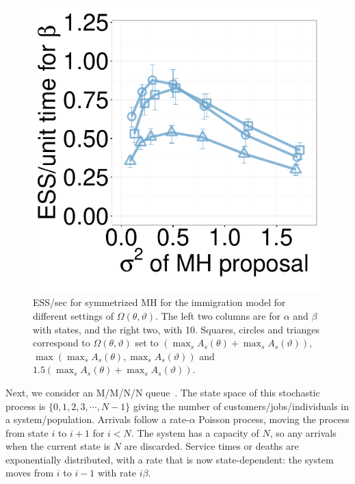 \begin{figure}[H]
\begin{minipage}[hp]{0.24\linewidth}
	\end{minipage}
  \begin{minipage}[hp]{0.24\linewidth}
  \centering
    \includegraphics [width=0.99\textwidth, angle=0]{figs/new_whole_exp_figs/mh_q_beta_dim10.pdf}
	\end{minipage}
    \caption{ESS/sec for symmetrized MH for the immigration model for different settings of $\Omega(\theta,\vartheta)$. The left two columns are for $\alpha$ and $\beta$ with states, and the right two, with 10. 
    Squares, circles and trianges correspond to $\Omega(\theta,\vartheta)$ set to $(\max_s A_s(\theta) + \max_s A_s(\vartheta))$, $\max(\max_s A_s(\theta), \max_s A_s(\vartheta))$ and  $1.5(\max_s A_s(\theta) + \max_s A_s(\vartheta))$.
  }
    \label{fig:mhESS_Q}
  \end{figure}


Next, we consider an M/M/N/N queue~\citep{gross2011fundamentals}. 
The state space of this stochastic process is $\{0, 1, 2, 3, \cdots, N - 1\}$ giving the number of customers/jobs/individuals in a system/population. 
Arrivals follow a rate-$\alpha$ Poisson process, moving the process from state 
$i$ to $i+1$ for $i<N$. The system has a capacity of $N$, so any arrivals when 
the current state is $N$ are discarded.  Service times or deaths are 
exponentially distributed, with a rate that is now state-dependent:
the system moves from $i$ to $i - 1$ with rate $i\beta$. 

